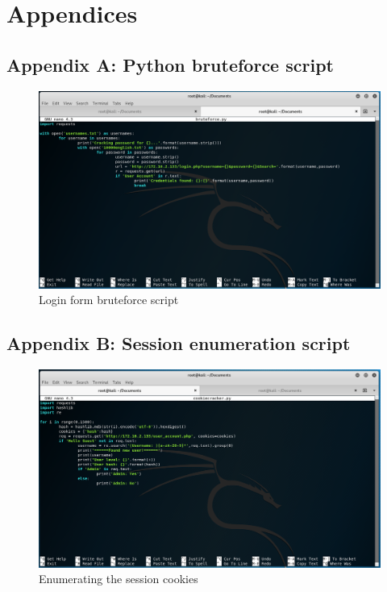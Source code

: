 \documentclass{report}
\begin{document}
\chapter{Appendices}
\section{Appendix A: Python bruteforce script}
\begin{figure}[!htb]
	\centering
	\includegraphics[scale=0.4]{img/bruteforcescript.png}
	\caption{Login form bruteforce script}
\end{figure}
\section{Appendix B: Session enumeration script}
\begin{figure}[!htb]
	\centering
	\includegraphics[scale=0.4]{img/cookiescript.png}
	\caption{Enumerating the session cookies}
\end{figure}


\end{document}
